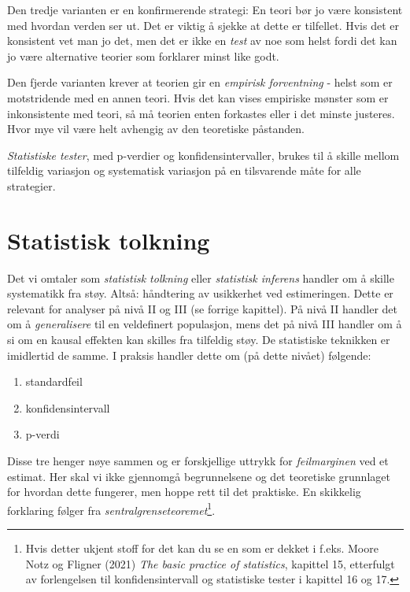 \documentclass[
  letterpaper,
  DIV=11,
  numbers=noendperiod]{scrreprt}
\providecommand{\tightlist}{%
  \setlength{\itemsep}{0pt}\setlength{\parskip}{0pt}}\usepackage{longtable,booktabs,array}
\theoremstyle{definition}
\theoremstyle{remark}
\begin{document}
Den tredje varianten er en konfirmerende strategi: En teori bør jo være
konsistent med hvordan verden ser ut. Det er viktig å sjekke at dette er
tilfellet. Hvis det er konsistent vet man jo det, men det er ikke en
\emph{test} av noe som helst fordi det kan jo være alternative teorier
som forklarer minst like godt.

Den fjerde varianten krever at teorien gir en \emph{empirisk
forventning} - helst som er motstridende med en annen teori. Hvis det
kan vises empiriske mønster som er inkonsistente med teori, så må
teorien enten forkastes eller i det minste justeres. Hvor mye vil være
helt avhengig av den teoretiske påstanden.

\emph{Statistiske tester}, med p-verdier og konfidensintervaller, brukes
til å skille mellom tilfeldig variasjon og systematisk variasjon på en
tilsvarende måte for alle strategier.

\hypertarget{statistisk-tolkning}{%
\chapter{Statistisk tolkning}\label{statistisk-tolkning}}

Det vi omtaler som \emph{statistisk tolkning} eller \emph{statistisk
inferens} handler om å skille systematikk fra støy. Altså: håndtering av
usikkerhet ved estimeringen. Dette er relevant for analyser på nivå II
og III (se forrige kapittel). På nivå II handler det om å
\emph{generalisere} til en veldefinert populasjon, mens det på nivå III
handler om å si om en kausal effekten kan skilles fra tilfeldig støy. De
statistiske teknikken er imidlertid de samme. I praksis handler dette om
(på dette nivået) følgende:

\begin{enumerate}
\def\labelenumi{\arabic{enumi})}
\tightlist
\item
  standardfeil
\item
  konfidensintervall
\item
  p-verdi
\end{enumerate}

Disse tre henger nøye sammen og er forskjellige uttrykk for
\emph{feilmarginen} ved et estimat. Her skal vi ikke gjennomgå
begrunnelsene og det teoretiske grunnlaget for hvordan dette fungerer,
men hoppe rett til det praktiske. En skikkelig forklaring følger fra
\emph{sentralgrenseteoremet}\footnote{Hvis detter ukjent stoff for det
  kan du se en som er dekket i f.eks. Moore Notz og Fligner (2021)
  \emph{The basic practice of statistics}, kapittel 15, etterfulgt av
  forlengelsen til konfidensintervall og statistiske tester i kapittel
  16 og 17.}.
\end{document}
